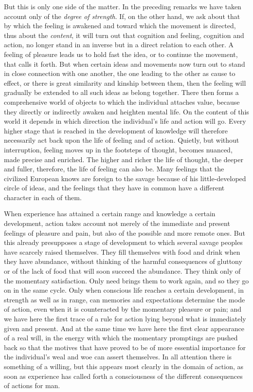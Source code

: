 \documentclass[12pt,a4paper,openany]{book}
\newcommand{\opage}[1]{\marginnote{\footnotesize\textit{[#1]}}}
\begin{document}
But this is only one side of the matter. In the preceding remarks we have
taken account only of the \emph{degree of strength}. If, on the other hand,
we ask about that by which the feeling is awakened and toward which the
movement is directed, thus about the \emph{content}, it will turn out that
cognition and feeling, cognition and action, no longer stand in an inverse
but in a direct relation to each other. A feeling of pleasure leads us to
hold fast the idea, or to continue the movement, that calls it forth. But
when certain ideas and movements now turn out to stand in close connection
with one another, the one leading to the other as cause to effect, or there
is \opage{9}great similarity and kinship between them, then the feeling will
gradually be extended to all such ideas as belong together. There then
forms a comprehensive world of objects to which the individual attaches
value, because they directly or indirectly awaken and heighten mental life.
On the content of this world it depends in which direction the individual's
life and action will go. Every higher stage that is reached in the
development of knowledge will therefore necessarily act back upon the life
of feeling and of action. Quietly, but without interruption, feeling moves
up in the footsteps of thought, becomes nuanced, made precise and enriched.
The higher and richer the life of thought, the deeper and fuller,
therefore, the life of feeling can also be. Many feelings that the
civilized European knows are foreign to the savage because of his
little-developed circle of ideas, and the feelings that they have in common
have a different character in each of them.

When experience has attained a certain range and knowledge a certain
development, action takes account not merely of the immediate and present
feelings of pleasure and pain, but also of the possible and more remote
ones. But this already presupposes a stage of development to which several
savage peoples have scarcely raised themselves. They fill themselves with
food and drink when they have abundance, without thinking of the harmful
consequences of gluttony or of the lack of food that will soon succeed the
abundance. They think only of the momentary satisfaction. Only need brings
them to work again, and \opage{10}so they go on in the same cycle. Only when
conscious life reaches a certain development, in strength as well as in
range, can memories and expectations determine the mode of action, even
when it is counteracted by the momentary pleasure or pain; and we have here
the first trace of a rule for action lying beyond what is immediately given
and present. And at the same time we have here the first clear appearance
of a real will, in the energy with which the momentary promptings are
pushed back so that the motives that have proved to be of more essential
importance for the individual's weal and woe can assert themselves. In all
attention there is something of a willing, but this appears most clearly in
the domain of action, as soon as experience has called forth a
consciousness of the different consequences of actions for man.
\end{document}
